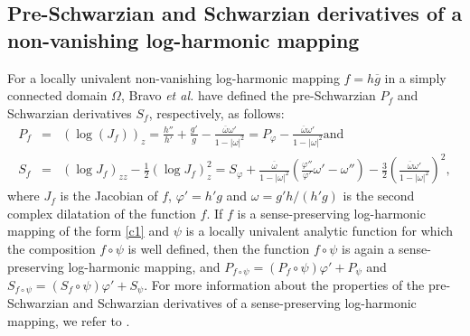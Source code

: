 \documentclass[12pt,reqno]{amsart}
\newtheorem{open problem}{Open problem}[section]
\newcommand{\ol}{\overline}
\newcommand{\beas}{\begin{eqnarray*}}
\newcommand{\eeas}{\end{eqnarray*}}
\renewcommand{\phi}{\varphi}
\numberwithin{equation}{section}
\begin{document}
\subsection{Pre-Schwarzian and Schwarzian derivatives of a non-vanishing log-harmonic mapping}
\indent For a locally univalent non-vanishing log-harmonic mapping $f=h\ol{g}$ in a simply connected domain $\Omega$, Bravo {\it et al.} \cite{BHPV2022} have defined the pre-Schwarzian $P_f$ and Schwarzian derivatives $S_f$, respectively, as follows:
\beas
P_f&=&\left(\log(J_f)\right)_z =\frac{h''}{h'}+\frac{g'}{g}-\frac{\overline{\omega}\omega'}{1-|\omega|^2}=P_\phi-\frac{\overline{\omega}\omega'}{1-|\omega|^2}\text{and}\\[2mm]
S_f&=&\left(\log J_f\right)_{zz}-\frac{1}{2}\left(\log J_f\right)_z^2=S_\phi+\frac{\overline{\omega}}{1-|\omega|^2}\left(\frac{\phi''}{\phi'}\omega'-\omega''\right)-\frac{3}{2}
\left(\frac{\overline{\omega}\omega'}{1-|\omega|^2}\right)^2,\eeas
where $J_f$ is the Jacobian of $f$, $\phi'=h' g$ and $\omega=g'h/(h' g)$ is the second complex dilatation of the function $f$. If $f$ is a sense-preserving log-harmonic mapping of the form \eqref{c1} and $\psi$ is a locally univalent analytic function for which the composition $f\circ\psi$ is well defined, then the function $f\circ\psi$ is again a sense-preserving log-harmonic mapping, and $P_{f\circ\psi}=(P_f\circ\psi)\phi'+P_\psi$ and $S_{f\circ\psi}=(S_f\circ\psi)\phi'+S_\psi$.
For more information about the properties of the pre-Schwarzian and Schwarzian derivatives of a sense-preserving log-harmonic mapping, we refer to \cite{BHPV2022, AP2024, MPW2013}.
\end{document}
